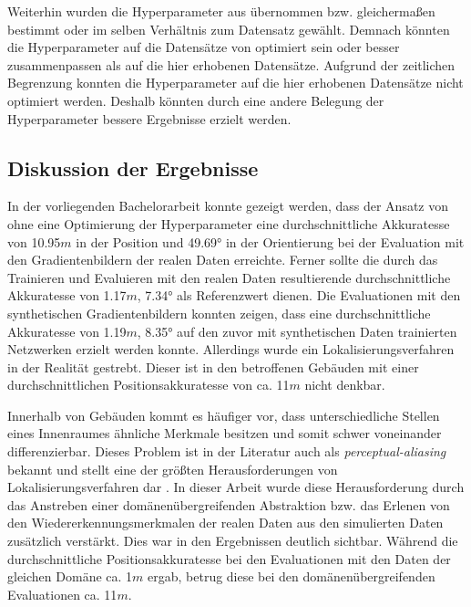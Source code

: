 Weiterhin wurden die Hyperparameter aus \citet{acharyaBIMPoseNetIndoorCamera2019} übernommen bzw. gleichermaßen bestimmt oder im selben Verhältnis zum Datensatz gewählt. Demnach könnten die Hyperparameter auf die Datensätze von \citet{acharyaBIMPoseNetIndoorCamera2019} optimiert sein oder besser zusammenpassen als auf die hier erhobenen Datensätze. Aufgrund der zeitlichen Begrenzung konnten die Hyperparameter auf die hier erhobenen Datensätze nicht optimiert werden. Deshalb könnten durch eine andere Belegung der Hyperparameter bessere Ergebnisse erzielt werden.

\subsection{Diskussion der Ergebnisse}


In der vorliegenden Bachelorarbeit konnte gezeigt werden, dass der Ansatz von \citet{acharyaBIMPoseNetIndoorCamera2019} ohne eine Optimierung der Hyperparameter eine durchschnittliche Akkuratesse von 10.95$m$ in der Position und 49.69° in der Orientierung bei der Evaluation mit den Gradientenbildern der realen Daten erreichte. Ferner sollte die durch das Trainieren und Evaluieren mit den realen Daten resultierende durchschnittliche Akkuratesse von 1.17$m$, 7.34° als Referenzwert dienen. Die Evaluationen mit den synthetischen Gradientenbildern konnten zeigen, dass eine durchschnittliche Akkuratesse von 1.19$m$, 8.35° auf den zuvor mit synthetischen Daten trainierten Netzwerken erzielt werden konnte. Allerdings wurde ein Lokalisierungsverfahren in der Realität gestrebt. Dieser ist in den betroffenen Gebäuden mit einer durchschnittlichen Positionsakkuratesse von ca. 11$m$ nicht denkbar. 

Innerhalb von Gebäuden kommt es häufiger vor, dass unterschiedliche Stellen eines Innenraumes ähnliche Merkmale besitzen und somit schwer voneinander differenzierbar. Dieses Problem ist in der Literatur auch als \textit{perceptual-aliasing} bekannt und stellt eine der größten Herausforderungen von Lokalisierungsverfahren dar \cite{lowryVisualPlaceRecognition2016}. In dieser Arbeit wurde diese Herausforderung durch das Anstreben einer domänenübergreifenden Abstraktion bzw. das Erlenen von den Wiedererkennungsmerkmalen der realen Daten aus den simulierten Daten zusätzlich verstärkt. Dies war in den Ergebnissen deutlich sichtbar. Während die durchschnittliche Positionsakkuratesse bei den Evaluationen mit den Daten der gleichen Domäne ca. 1$m$ ergab, betrug diese bei den domänenübergreifenden Evaluationen ca. 11$m$.

